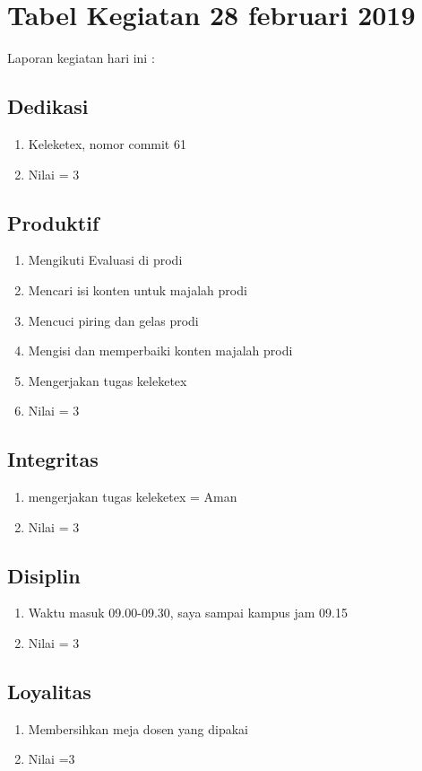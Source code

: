\section{Tabel Kegiatan 28 februari 2019}
Laporan kegiatan hari ini :
\subsection{Dedikasi}
\begin{enumerate}
\item Keleketex, nomor commit 61 
\item Nilai = 3
\end{enumerate}

\subsection{Produktif}
\begin{enumerate}
\item Mengikuti Evaluasi di prodi
\item Mencari isi konten untuk majalah prodi
\item Mencuci piring dan gelas prodi
\item Mengisi dan memperbaiki konten majalah prodi
\item Mengerjakan tugas keleketex
\item Nilai = 3
\end{enumerate}

\subsection{Integritas}
\begin{enumerate}
\item mengerjakan tugas keleketex = Aman
\item Nilai = 3
\end{enumerate}

\subsection{Disiplin}
\begin{enumerate}
\item Waktu masuk 09.00-09.30, saya sampai kampus jam 09.15
\item Nilai = 3
\end{enumerate}

\subsection {Loyalitas}
\begin{enumerate}
\item Membersihkan meja dosen yang dipakai
\item Nilai =3
\end {enumerate}

